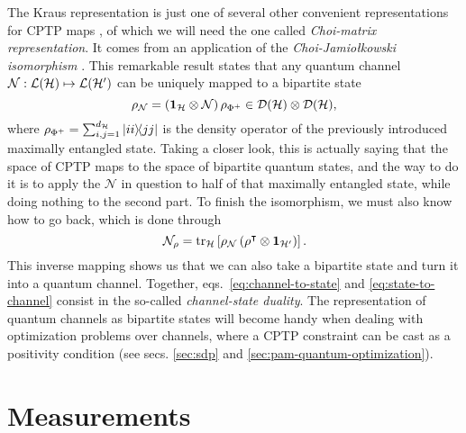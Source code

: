 		The Kraus representation is just one of several other convenient representations for CPTP maps \cite{wood_2015_tensor}, of which we will need the one called \emph{Choi-matrix representation}. It comes from an application of the \emph{Choi-Jamiołkowski isomorphism} \cite{jamiolkowski,jiang_2013_channelstate}. This remarkable result states that any quantum channel $\mathcal{N} : \mathcal{L}(\mathcal{H}) \mapsto \mathcal{L}(\mathcal{H}^\prime)$ can be uniquely mapped to a bipartite state
		\begin{equation}
			\rho_{\mathcal{N}} = \left(\mathbf{1}_{\mathcal{H}} \otimes \mathcal{N} \right) \rho_{\Phi^+} \in \mathcal{D}(\mathcal{H}) \otimes \mathcal{D}(\mathcal{H}) ,
			\label{eq:channel-to-state}
		\end{equation}
		where $\rho_{\Phi^+} = \sum_{i,j=1}^{d_{\mathcal{H}}} \ketbra{ii}{jj}$ is the density operator of the previously introduced maximally entangled state. Taking a closer look, this is actually saying that the space of CPTP maps to the space of bipartite quantum states, and the way to do it is to apply the $\mathcal{N}$ in question to half of that maximally entangled state, while doing nothing to the second part. To finish the isomorphism, we must also know how to go back, which is done through
		\begin{equation}
			\mathcal{N}_\rho = \text{tr}_{\mathcal{H}}\left[ \rho_{\mathcal{N}} \left( \rho^\intercal \otimes \mathbf{1}_{\mathcal{H}^\prime} \right) \right] .
			\label{eq:state-to-channel}
		\end{equation}
		This inverse mapping shows us that we can also take a bipartite state and turn it into a quantum channel. Together, eqs.~\eqref{eq:channel-to-state} and \eqref{eq:state-to-channel} consist in the so-called \emph{channel-state duality}. The representation of quantum channels as bipartite states will become handy when dealing with optimization problems over channels, where a CPTP constraint can be cast as a positivity condition (see secs. \ref{sec:sdp} and \ref{sec:pam-quantum-optimization}).
		

	\section{Measurements}
	\label{sec:measurements}
	
